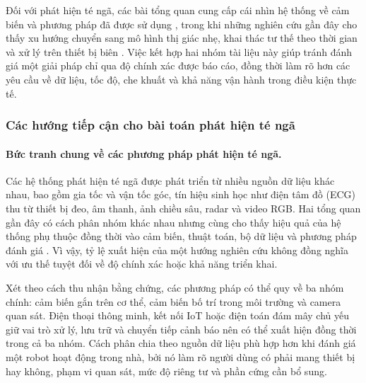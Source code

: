 Đối với phát hiện té ngã, các bài tổng quan cung cấp cái nhìn hệ thống về cảm biến và phương pháp đã được sử dụng , trong khi những nghiên cứu gần đây cho thấy xu hướng chuyển sang mô hình thị giác nhẹ, khai thác tư thế theo thời gian và xử lý trên thiết bị biên . Việc kết hợp hai nhóm tài liệu này giúp tránh đánh giá một giải pháp chỉ qua độ chính xác được báo cáo, đồng thời làm rõ hơn các yêu cầu về dữ liệu, tốc độ, che khuất và khả năng vận hành trong điều kiện thực tế.

\subsubsection{Các hướng tiếp cận cho bài toán phát hiện té ngã}

\paragraph{Bức tranh chung về các phương pháp phát hiện té ngã.}
Các hệ thống phát hiện té ngã được phát triển từ nhiều nguồn dữ liệu khác nhau, bao gồm gia tốc và vận tốc góc, tín hiệu sinh học như điện tâm đồ (ECG) thu từ thiết bị đeo, âm thanh, ảnh chiều sâu, radar và video RGB. Hai tổng quan gần đây có cách phân nhóm khác nhau nhưng cùng cho thấy hiệu quả của hệ thống phụ thuộc đồng thời vào cảm biến, thuật toán, bộ dữ liệu và phương pháp đánh giá . Vì vậy, tỷ lệ xuất hiện của một hướng nghiên cứu không đồng nghĩa với ưu thế tuyệt đối về độ chính xác hoặc khả năng triển khai.

Xét theo cách thu nhận bằng chứng, các phương pháp có thể quy về ba nhóm chính: cảm biến gắn trên cơ thể, cảm biến bố trí trong môi trường và camera quan sát. Điện thoại thông minh, kết nối IoT hoặc điện toán đám mây chủ yếu giữ vai trò xử lý, lưu trữ và chuyển tiếp cảnh báo nên có thể xuất hiện đồng thời trong cả ba nhóm. Cách phân chia theo nguồn dữ liệu phù hợp hơn khi đánh giá một robot hoạt động trong nhà, bởi nó làm rõ người dùng có phải mang thiết bị hay không, phạm vi quan sát, mức độ riêng tư và phần cứng cần bổ sung.

